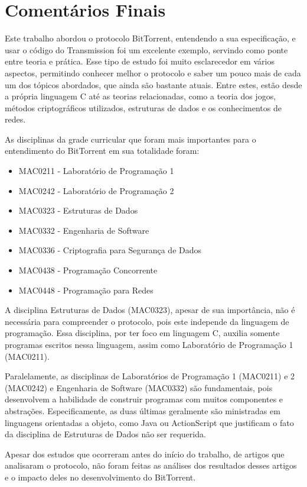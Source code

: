 
\chapter{Comentários Finais}

Este trabalho abordou o protocolo BitTorrent, entendendo a sua especificação, e usar o
código do Transmission foi um excelente exemplo, servindo como ponte entre teoria e
prática. Esse tipo de estudo foi muito esclarecedor em vários aspectos, permitindo
conhecer melhor o protocolo e saber um pouco mais de cada um dos tópicos abordados, que
ainda são bastante atuais. Entre estes, estão desde a própria linguagem C até as
teorias relacionadas, como a teoria dos jogos, métodos criptográficos utilizados,
estruturas de dados e os conhecimentos de redes.

As disciplinas da grade curricular que foram mais importantes para o entendimento do
BitTorrent em sua totalidade foram:

\begin{itemize}
    \item MAC0211 - Laboratório de Programação 1
    \item MAC0242 - Laboratório de Programação 2
    \item MAC0323 - Estruturas de Dados
    \item MAC0332 - Engenharia de Software
    \item MAC0336 - Criptografia para Segurança de Dados
    \item MAC0438 - Programação Concorrente
    \item MAC0448 - Programação para Redes
\end{itemize}

A disciplina Estruturas de Dados (MAC0323), apesar de sua importância, não é necessária
para compreender o protocolo, pois este independe da linguagem de programação. Essa
disciplina, por ter foco em linguagem C, auxilia somente programas escritos nessa
linguagem, assim como Laboratório de Programação 1 (MAC0211).

Paralelamente, as disciplinas de Laboratórios de Programação 1 (MAC0211) e 2 (MAC0242)
e Engenharia de Software (MAC0332) são fundamentais, pois desenvolvem a habilidade de
construir programas com muitos componentes e abstrações. Especificamente, as duas
últimas geralmente são ministradas em linguagens orientadas a objeto, como Java ou
ActionScript que justificam o fato da disciplina de Estruturas de Dados não ser
requerida.

Apesar dos estudos que ocorreram antes do início do trabalho, de artigos que analisaram
o protocolo, não foram feitas as análises dos resultados desses artigos e o impacto
deles no desenvolvimento do BitTorrent.


\afterpage{\clearpage}